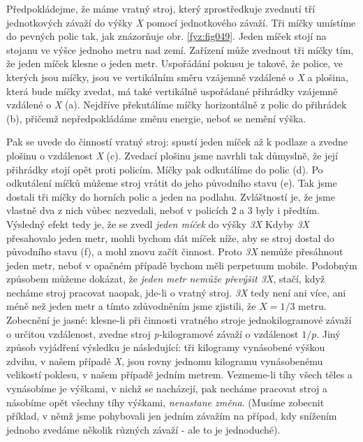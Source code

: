     Předpokládejme, že máme vratný stroj, který zprostředkuje zvednutí tří jednotkových závaží do 
    výšky \emph{X} pomocí jednotkového závaží. Tři míčky umístíme do pevných polic tak, jak 
    znázorňuje obr. \ref{fyz:fig049}. Jeden míček stojí na stojanu ve výšce jednoho metru nad zemí. 
    Zařízení může zvednout tři míčky tím, že jeden míček klesne o jeden metr. Uspořádání pokusu je 
    takové, že police, ve kterých jsou míčky, jsou ve vertikálním směru vzájemně vzdálené o 
    \emph{X} a plošina, která bude míčky zvedat, má také vertikálně uspořádané přihrádky vzájemně 
    vzdálené o \emph{X} (a). Nejdříve překutálíme míčky horizontálně z polic do přihrádek (b), 
    přičemž nepředpokládáme změnu energie, neboť se nemění výška.

    Pak se uvede do činností vratný stroj: spustí jeden míček až k podlaze a zvedne plošinu o 
    vzdálenost \emph{X} (c). Zvedací plošinu jsme navrhli tak důmyslně, že její přihrádky stojí 
    opět proti policím. Míčky pak odkutálíme do polic (d). Po odkutálení míčků můžeme stroj vrátit 
    do jeho původního stavu (e). Tak jsme dostali tři míčky do horních polic a jeden na podlahu. 
    Zvláštností je, že jsme vlastně dva z nich vůbec nezvedali, neboť v policích 2 a 3 byly i 
    předtím. Výsledný efekt tedy je, že se zvedl \emph{jeden míček} do výšky \emph{3X} Kdyby 
    \emph{3X} přesahovalo jeden metr, mohli bychom dát míček níže, aby se stroj dostal do původního 
    stavu (f), a mohl znovu začít činnost. Proto \emph{3X} nemůže přesáhnout jeden metr, neboť v 
    opačném případě bychom měli perpetuum mobile. Podobným způsobem můžeme dokázat, že \emph{jeden 
    metr nemůže převýšit 3X}, stačí, když necháme stroj pracovat naopak, jde-li o vratný stroj. 
    \emph{3X} tedy není ani více, ani méně než jeden metr a tímto zdůvodněním jsme zjistili, že 
    \(X= 1/3\) metru. Zobecnění je jasné: klesne-li při činnosti vratného stroje jednokilogramové 
    závaží o určitou vzdálenost, zvedne stroj \emph{p-}kilogramové závaží o vzdálenost \(1/p\). 
    Jiný způsob vyjádření výsledku je následující: tři kilogramy vynásobené výškou zdvihu, v našem 
    případě \emph{X}, jsou rovny jednomu kilogramu vynásobenému velikostí poklesu, v našem případě 
    jedním metrem. Vezmeme-li tíhy všech těles a vynásobíme je výškami, v nichž se nacházejí, pak 
    necháme pracovat stroj a násobíme opět všechny tíhy výškami, \emph{nenastane změna}. (Musíme 
    zobecnit příklad, v němž jsme pohybovali jen jedním závažím na případ, kdy snížením jednoho 
    zvedáme několik různých závaží - ale to je jednoduché).
    

